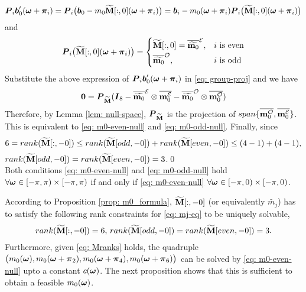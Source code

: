 $$ \boldsymbol{P}_i\boldsymbol{b}_0'(\boldsymbol{\omega}+\boldsymbol{\pi}_i) = \boldsymbol{P}_i\big(\boldsymbol{b}_0 - m_0\widetilde{\mathbf{M}}[:,0](\boldsymbol{\omega}+\boldsymbol{\pi}_i)\big)  = \boldsymbol{b}_i - m_0(\boldsymbol{\omega}+\boldsymbol{\pi}_i)\boldsymbol{P}_i\big(\widetilde{\mathbf{M}}[:,0](\boldsymbol{\omega}+\boldsymbol{\pi}_i)\big)$$
and 
$$\boldsymbol{P}_i\big(\widetilde{\mathbf{M}}[:,0](\boldsymbol{\omega}+\boldsymbol{\pi}_i)\big) = 
\begin{cases}
   \widetilde{\mathbf{M}}[:,0] = \overline{\widetilde{\mathbf{m}_0}}^{\mathcal{E}}, &  i \text{ is even}\\[.2em]
    \overline{\widetilde{\mathbf{m}_0}}^{\mathcal{O}},              & i \text{ is odd}
\end{cases}
$$
Substitute the above expression of $ \boldsymbol{P}_i\boldsymbol{b}_0'(\boldsymbol{\omega}+\boldsymbol{\pi}_i)$ in \eqref{eq: group-proj} and we have
\begin{align}
\boldsymbol{0}  
= \boldsymbol{P}_{\widetilde{\mathbf{M}}}(\boldsymbol{I}_8 -  \overline{\widetilde{\mathbf{m}_0}}^{\mathcal{E}}\otimes\overline{\mathbf{m}_0^{\mathcal{E}}} - \overline{\widetilde{\mathbf{m}_0}}^{\mathcal{O}}\otimes\overline{\mathbf{m}_0^{\mathcal{O}}})
\end{align}
Therefore, by Lemma \ref{lem: null-space}, $\boldsymbol{P}_{\widetilde{\mathbf{M}}}$ is the projection of $span\{\overline{\mathbf{m}_0^{\mathcal{O}}},\overline{\mathbf{m}_0^{\mathcal{E}}}\}$. This is equivalent to \eqref{eq: m0-even-null} and \eqref{eq: m0-odd-null}.
Finally, since $$6 = rank(\widetilde{\mathbf{M}}[:,-0]) \leq rank(\widetilde{\mathbf{M}}[odd,-0]) + rank(\widetilde{\mathbf{M}}[even,-0]) \leq (4-1) + (4-1),$$ $rank(\widetilde{\mathbf{M}}[odd,-0]) = rank(\widetilde{\mathbf{M}}[even,-0]) = 3$.\qed\\[.2em]
 Both conditions \eqref{eq: m0-even-null} and \eqref{eq: m0-odd-null} hold $\forall \boldsymbol{\omega}\in[-\pi,\pi)\times[-\pi,\pi)$ if and only if \eqref{eq: m0-even-null} $\forall \boldsymbol{\omega}\in [-\pi,0)\times[-\pi,0)$.

According to Proposition \ref{prop: m0_formula}, $\widetilde{\mathbf{M}}[:,-0]$ (or equivalently $\widetilde{m_j}$) has to satisfy the following rank constraints for \eqref{eq: mj-eq} to be uniquely solvable, 
\begin{align}\label{eq: Mranks}
rank(\widetilde{\mathbf{M}}[:,-0]) = 6,\, rank(\widetilde{\mathbf{M}}[odd,-0]) = rank(\widetilde{\mathbf{M}}[even,-0]) = 3.
\end{align}
Furthermore, given \eqref{eq: Mranks} holds, the quadruple  $\big( m_0(\boldsymbol{\omega}),m_0(\boldsymbol{\omega}+\boldsymbol{\pi}_2), m_0(\boldsymbol{\omega} +\boldsymbol{\pi}_4), m_0(\boldsymbol{\omega}+\boldsymbol{\pi}_6) \big)$ can be solved by \eqref{eq: m0-even-null} upto a constant $c(\boldsymbol{\omega})$. The next proposition shows that this is sufficient to obtain a feasible $m_0(\boldsymbol{\omega})$.

